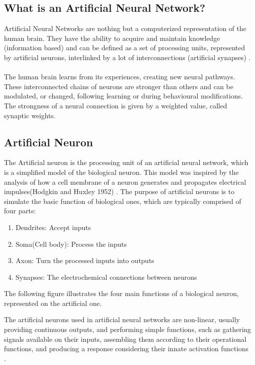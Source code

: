\subsection{What is an Artificial Neural Network?}
Artificial Neural Networks are nothing but a computerized representation of the human brain. 
They have the ability to acquire and maintain knowledge (information based) and can be defined as a set of processing units, represented by artificial neurons,
interlinked by a lot of interconnections
(artificial synapses) \cite[p.~5]{Silva2016}.\\\\
The human brain learns from its experiences, creating new neural pathways. These interconnected chains of neurons are stronger than others and can be modulated, or changed,
following learning or during behavioural modifications.
The strongness of a neural connection is given by a weighted value, called synaptic weights.

\subsection{Artificial Neuron}
The Artificial neuron is the processing unit of an artificial neural network, which is a simplified model of the biological neuron.
This model was inspired by the analysis of how a cell membrane of a neuron generates and propagates electrical impulses(Hodgkin and Huxley 1952) \cite[p.~11]{Silva2016}.
The purpose of artificial neurons is to simulate the basic function of biological ones,
which are typically comprised of four parts:

\begin{enumerate}
	\item Dendrites: Accept inputs
	\item Soma(Cell body): Process the inputs
	\item Axon: Turn the processed inputs into outputs
	\item Synapses: The electrochemical connections between neurons 
\end{enumerate}
The following figure illustrates the four main functions of a biological neuron, represented on the artificial one. 

The artificial neurons used in artificial neural networks are non-linear, usually providing continuous outputs,
and performing simple functions,
such as gathering signals available on their inputs,
assembling them according to their operational functions,
and producing a response considering their innate activation functions \cite[p.~11]{Silva2016}. 

